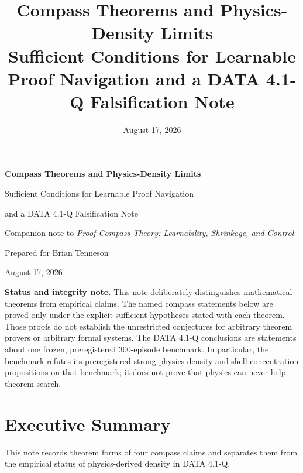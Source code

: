 \documentclass[11pt]{article}
\title{\textbf{Compass Theorems and Physics-Density Limits}\\
\large Sufficient Conditions for Learnable Proof Navigation and a DATA 4.1-Q Falsification Note}
\date{August 17, 2026}
\begin{document}
\begin{titlepage}
\centering
\vspace*{1.0in}
{\Huge\bfseries Compass Theorems and Physics-Density Limits\par}
\vspace{0.25in}
{\LARGE Sufficient Conditions for Learnable Proof Navigation\par}
\vspace{0.20in}
{\Large and a DATA 4.1-Q Falsification Note\par}
\vspace{0.55in}
{\large Companion note to \emph{Proof Compass Theory: Learnability, Shrinkage, and Control}\par}
\vfill
{\large Prepared for Brian Tenneson\par}
\vspace{0.12in}
{\large August 17, 2026\par}
\vspace{0.45in}
\begin{minipage}{0.86\textwidth}
\small
\textbf{Status and integrity note.}
This note deliberately distinguishes mathematical theorems from empirical claims. The named compass statements below are proved only under the explicit sufficient hypotheses stated with each theorem. Those proofs do not establish the unrestricted conjectures for arbitrary theorem provers or arbitrary formal systems. The DATA 4.1-Q conclusions are statements about one frozen, preregistered 300-episode benchmark. In particular, the benchmark refutes its preregistered strong physics-density and shell-concentration propositions on that benchmark; it does not prove that physics can never help theorem search.
\end{minipage}
\vfill
\end{titlepage}

\tableofcontents
\newpage

\section{Executive Summary}

This note records theorem forms of four compass claims and separates them from the empirical status of physics-derived density in DATA 4.1-Q.
\end{document}
